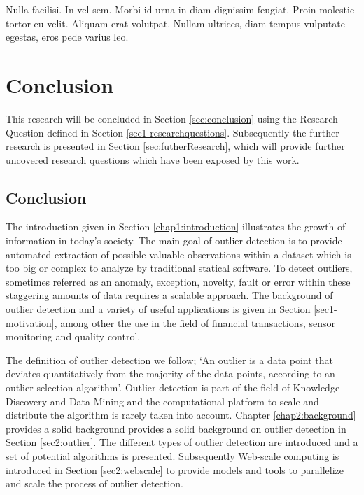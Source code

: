 \begin{savequote}[75mm] 
Nulla facilisi. In vel sem. Morbi id urna in diam dignissim feugiat. Proin molestie tortor eu velit. Aliquam erat volutpat. Nullam ultrices, diam tempus vulputate egestas, eros pede varius leo.
\end{savequote}


\chapter{Conclusion \label{chap6:results}}

This research will be concluded in Section \ref{sec:conclusion} using the Research Question defined in Section \ref{sec1-researchquestions}. Subsequently the further research is presented in Section \ref{sec:futherResearch}, which will provide further  uncovered research questions which have been exposed by this work.

\section{Conclusion \label{sec:conclusion}}

The introduction given in Section \ref{chap1:introduction} illustrates the growth of information in today's society. The main goal of outlier detection is to provide automated extraction of possible valuable observations within a dataset which is too big or complex to analyze by traditional statical software. To detect outliers, sometimes referred as an anomaly, exception, novelty, fault or error within these staggering amounts of data requires a scalable approach. The background of outlier detection and a variety of useful applications is given in Section \ref{sec1-motivation}, among other the use in the field of financial transactions, sensor monitoring and quality control.

The definition of outlier detection we follow; `An outlier is a data point that deviates quantitatively from the majority of the data points, according to an outlier-selection algorithm'. Outlier detection is part of the field of Knowledge Discovery and Data Mining and the computational platform to scale and distribute the algorithm is rarely taken into account. Chapter \ref{chap2:background} provides a solid background provides a solid background on outlier detection in Section \ref{sec2:outlier}. The different types of outlier detection are introduced and a set of potential algorithms is presented. Subsequently Web-scale computing is introduced in Section \ref{sec2:webscale} to provide models and tools to parallelize and scale the process of outlier detection.

